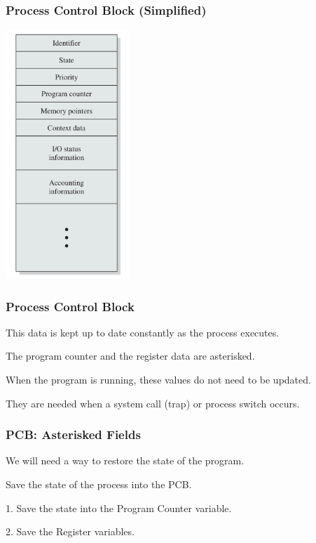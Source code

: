 \begin{frame}
\frametitle{Process Control Block (Simplified)}

\begin{center}
\includegraphics[width=0.35\textwidth]{images/pcb.png}
\end{center}

\end{frame}

\begin{frame}
\frametitle{Process Control Block}

This data is kept up to date constantly as the process executes.  

The program counter and the register data are asterisked. 

When the program is running, these values do not need to be updated. 

They are needed when a system call (trap) or process switch occurs.

\end{frame}

\begin{frame}
\frametitle{PCB: Asterisked Fields}
We will need a way to restore the state of the program. 

Save the state of the process into the PCB. 

1. Save the state into the Program Counter variable. 

2. Save the Register variables.

\end{frame}

